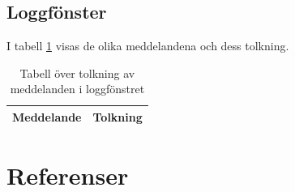 \documentclass[a4paper,12pt]{article}
\begin{document}
\subsection{Loggfönster}
\label{subsec:logg}
I tabell \ref{tab:logg} visas de olika meddelandena och dess tolkning.



\begin{table}[H]
    \centering
    \begin{tabularx}{\textwidth}{|l|X|}
        \hline \textbf{Meddelande} & \textbf{Tolkning} \\ \hline
    \end{tabularx}
\caption{Tabell över tolkning av meddelanden i loggfönstret}
\label{tab:logg}
\end{table}

\newpage
\section*{Referenser}


\newpage
\appendix
\end{document}
